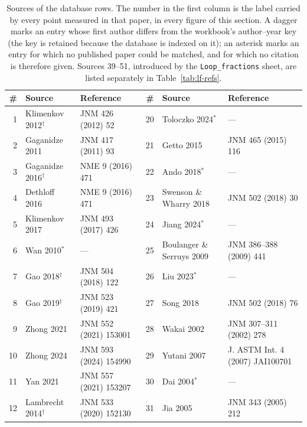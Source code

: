 \begin{table}[htbp]
\centering\small
\caption{Sources of the database rows. The number in the first column is the
label carried by every point measured in that paper, in every figure of this
section. A dagger marks an entry whose first author differs from the workbook's
author--year key (the key is retained because the database is indexed on it);
an asterisk marks an entry for which no published paper could be matched, and
for which no citation is therefore given. Sources 39--51, introduced by the
\texttt{Loop\_fractions} sheet, are listed separately in
Table~\ref{tab:lf-refs}.}
\label{tab:refs}
\begin{tabular}{rllrll}
\toprule
\# & Source & Reference & \# & Source & Reference \\
\midrule
 1 & Klimenkov 2012$^{\dagger}$    & JNM 426 (2012) 52      & 20 & Toloczko 2024$^{*}$        & --- \\
 2 & Gaganidze 2011                & JNM 417 (2011) 93      & 21 & Getto 2015                 & JNM 465 (2015) 116 \\
 3 & Gaganidze 2016$^{\dagger}$    & NME 9 (2016) 471       & 22 & Ando 2018$^{*}$            & --- \\
 4 & Dethloff 2016                 & NME 9 (2016) 471       & 23 & Swenson \& Wharry 2018     & JNM 502 (2018) 30 \\
 5 & Klimenkov 2017                & JNM 493 (2017) 426     & 24 & Jiang 2024$^{*}$           & --- \\
 6 & Wan 2010$^{*}$                & ---                    & 25 & Boulanger \& Serruys 2009  & JNM 386--388 (2009) 441 \\
 7 & Gao 2018$^{\dagger}$          & JNM 504 (2018) 122     & 26 & Liu 2023$^{*}$             & --- \\
 8 & Gao 2019$^{\dagger}$          & JNM 523 (2019) 421     & 27 & Song 2018                  & JNM 502 (2018) 76 \\
 9 & Zhong 2021                    & JNM 552 (2021) 153001  & 28 & Wakai 2002                 & JNM 307--311 (2002) 278 \\
10 & Zhong 2024                    & JNM 593 (2024) 154990  & 29 & Yutani 2007                & J. ASTM Int. 4 (2007) JAI100701 \\
11 & Yan 2021                      & JNM 557 (2021) 153207  & 30 & Dai 2004$^{*}$             & --- \\
12 & Lambrecht 2014$^{\dagger}$    & JNM 533 (2020) 152130  & 31 & Jia 2005                   & JNM 343 (2005) 212 \\

\end{tabular}
\end{table}
